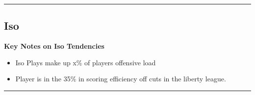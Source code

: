 \documentclass[a4paper,12pt]{article}
\begin{document}
\vspace{-1em} %
\hrule height 1pt width 1\textwidth %
\vspace{1em} %

\clearpage


\subsection{Iso}
\vspace{0.25em} %
\textbf{Key Notes on Iso Tendencies}
\vspace{0.5em} %

\begin{itemize}
    \item Iso Plays make up x\% of players offensive load
    \vspace{0.3em} %
    \item Player is in the 35\% in scoring efficiency off cuts in the liberty league.
\end{itemize}

\vspace{1em} %
\hrule height 1pt width 1\textwidth %
\vspace{0em} %
\end{document}

